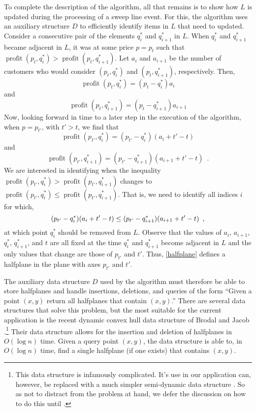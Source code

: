 \documentclass{llncs}
\newcommand{\val}{\operatorname{profit}}
\begin{document}
To complete the description of the algorithm, all that remains is to
show how $L$ is updated during the processing of a sweep line event.
For this, the algorithm uses an auxiliary structure $D$ to efficiently
identify items in $L$ that need to updated.  Consider a consecutive
pair of the elements $q^*_i$ and $q^*_{i+1}$ in $L$.  When $q^*_i$ and
$q^*_{i+1}$ became adjacent in $L$, it was at some price $p=p_t$ such
that $\val(p_t,q^*_i)>\val(p_t,q^*_{i+1})$.  Let $a_i$ and $a_{i+1}$
be the number of customers who would consider $(p_t,q^*_i)$ and
$(p_t,q^*_{i+1})$, respectively. Then,
\[
  \val(p_t,q^*_i) = (p_t-q^*_i)a_i
\]
and
\[
  \val(p_t,q^*_{i+1}) = (p_t-q^*_{i+1})a_{i+1}
\]
Now, looking forward in time to a later step in the execution of
the algorithm, when $p=p_{t'}$, with $t'> t$, we find that
\[
  \val(p_{t'},q^*_i) = (p_{t'}-q^*_i)(a_i+t'-t)
\]
and
\[
  \val(p_{t'},q^*_{i+1}) = (p_{t'}-q^*_{i+1})(a_{i+1}+t'-t) \enspace .
\]
We are interested in identifying when the inequality
$\val(p_{t'},q^*_i) > \val(p_{t'},q^*_{i+1})$ changes to 
$\val(p_{t'},q^*_i) \le \val(p_{t'},q^*_{i+1})$.  That is, we need to
identify all indices $i$ for which, 
\begin{equation}
  (p_{t'}-q^*_i)(a_i+t'-t) \le (p_{t'}-q^*_{i+1})(a_{i+1}+t'-t)  \enspace ,
    \eqlabel{halfplane}
\end{equation}
at which point $q^*_i$ should be removed from $L$.  Observe that
the values of $a_i$, $a_{i+1}$, $q^*_i$, $q^*_{i+1}$, and $t$ are all
fixed at the time $q^*_i$ and $q^*_{i+1}$ become adjacent in $L$ and
the only values that change are those of $p_{t'}$ and $t'$.  Thus,
\eqref{halfplane} defines a halfplane in the plane with axes
$p_{t'}$ and $t'$.

The auxiliary data structure $D$ used by the algorithm must therefore be
able to store halfplanes and handle insertions, deletions, and queries
of the form ``Given a point $(x,y)$ return all halfplanes that contain
$(x,y)$.'' There are several data structures that solve this problem,
but the most suitable for the current application is the recent dynamic
convex hull data structure of Brodal and Jacob \cite{bj02}.\footnote{This
data structure is infamously complicated.  It's use in our application
can, however, be replaced with a much simpler semi-dynamic data structure
\cite{ds91}.  So as not to distract from the problem at hand, we defer
the discussion on how to do this until .}  Their
data structure allows for the insertion and deletion of halfplanes in
$O(\log n)$ time.  Given a query point $(x,y)$, the data structure is
able to, in $O(\log n)$ time, find a single halfplane (if one exists)
that contains $(x,y)$.
\end{document}
